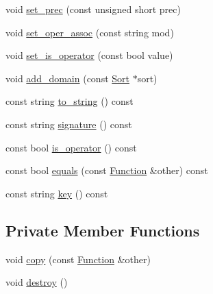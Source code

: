 \begin{CompactItemize}
\item 
void \hyperlink{classgenevalmag_1_1Function_56dbc3c8050d207b3fb5542d227326b7}{set\_\-prec} (const unsigned short prec)
\item 
void \hyperlink{classgenevalmag_1_1Function_5bf49ede4083dc9621eae9ff8e8b9418}{set\_\-oper\_\-assoc} (const string mod)
\item 
void \hyperlink{classgenevalmag_1_1Function_0814d3aa8b3034c5e415b0dacd65a059}{set\_\-is\_\-operator} (const bool value)
\item 
void \hyperlink{classgenevalmag_1_1Function_283f269af558ded12c3dd51a7edb774a}{add\_\-domain} (const \hyperlink{classgenevalmag_1_1Sort}{Sort} $\ast$sort)
\item 
const string \hyperlink{classgenevalmag_1_1Function_e730b6f7f0108383e1acbdde13813585}{to\_\-string} () const 
\item 
const string \hyperlink{classgenevalmag_1_1Function_13bd09282fcdf0edec0b8881939d6928}{signature} () const 
\item 
const bool \hyperlink{classgenevalmag_1_1Function_011d344c0a5d6fc3d1d851967028010a}{is\_\-operator} () const 
\item 
const bool \hyperlink{classgenevalmag_1_1Function_4a9007a5fc8a9e4781144b580e127109}{equals} (const \hyperlink{classgenevalmag_1_1Function}{Function} \&other) const 
\item 
const string \hyperlink{classgenevalmag_1_1Function_b1928425174bc0856db6a7d700061fca}{key} () const 
\end{CompactItemize}
\subsection*{Private Member Functions}
\begin{CompactItemize}
\item 
void \hyperlink{classgenevalmag_1_1Function_3a30e9b7d22c2426c34b025bc460ecda}{copy} (const \hyperlink{classgenevalmag_1_1Function}{Function} \&other)
\item 
void \hyperlink{classgenevalmag_1_1Function_280800ca78b087d0d098bc89fe7b5190}{destroy} ()
\end{CompactItemize}
